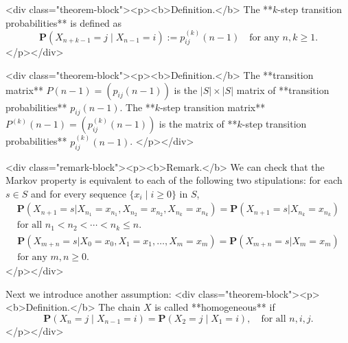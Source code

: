 
<div class="theorem-block"><p><b>Definition.</b> 
The **$k$-step transition probabilities** is defined as
$$$$$$$$\begin{equation}
    \label{eq:7.2}
    \tag{7-2}
    \mathbf{P}(X_{n+k-1} = j \;\vert\; X_{n-1} = i) := p_{ij}^{(k)}(n-1) \quad \text{for any } n, k \geq 1.
\end{equation}$$$$$$$$
</p></div>

<div class="theorem-block"><p><b>Definition.</b> 
The **transition matrix** $P(n-1) = (p_{ij}(n-1))$ is the $\left\vert S \right\vert \times \left\vert S \right\vert$ matrix of **transition probabilities** $p_{ij}(n-1)$. The **$k$-step transition matrix** $P^{(k)}(n-1) = (p_{ij}^{(k)}(n-1))$ is the matrix of **$k$-step transition probabilities** $p_{ij}^{(k)}(n-1)$.
</p></div>

<div class="remark-block"><p><b>Remark.</b> 
We can check that the Markov property is equivalent to each of the following two stipulations: for each $s \in S$ and for every sequence $\{ x_i \;\vert\; i \geq 0\}$ in $S$,
$$$$$$$$\begin{equation}
    \label{eq:7.3a}
    \tag{7-3a}
    \begin{split}
        \mathbf{P}\left(X_{n+1}=s | X_{n_{1}}=x_{n_{1}}, X_{n_{2}}=x_{n_{2}}, X_{n_{k}}=x_{n_{k}}\right)=\mathbf{P}\left(X_{n+1}=s | X_{n_{k}}=x_{n_{k}}\right) \\
        \text{for all } n_1 < n_2 < \cdots < n_k \leq n.
    \end{split}
\end{equation}$$$$$$$$
$$$$$$$$\begin{equation}
    \label{eq:7.3b}
    \tag{7-3b}
    \begin{split}
        \mathbf{P}\left(X_{m+n}=s | X_{0}=x_{0}, X_{1}=x_{1}, \ldots, X_{m}=x_{m}\right)=\mathbf{P}\left(X_{m+n}=s | X_{m}=x_{m}\right) \\ 
        \text{for any } m, n \geq 0.
    \end{split}
\end{equation}$$$$$$$$
</p></div>

Next we introduce another assumption:
<div class="theorem-block"><p><b>Definition.</b> 
The chain $X$ is called **homogeneous** if
$$\begin{equation}
    \mathbf{P}(X_n = j \;\vert\; X_{n-1} = i) = \mathbf{P}(X_2 = j \;\vert\; X_1 = i), \quad \text{for all } n, i, j.
\end{equation}$$
</p></div>

